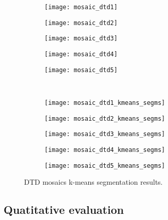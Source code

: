 \begin{figure}[!ht]
    \centering
    \begin{subfigure}[b]{0.19\textwidth}
        \texttt{[image: mosaic\_dtd1]}
    \end{subfigure} 
    \begin{subfigure}[b]{0.19\textwidth}
    	\texttt{[image: mosaic\_dtd2]}
    \end{subfigure}     
    \begin{subfigure}[b]{0.19\textwidth}
        \texttt{[image: mosaic\_dtd3]}
    \end{subfigure}
    \begin{subfigure}[b]{0.19\textwidth}
    	\texttt{[image: mosaic\_dtd4]}
    \end{subfigure}    
    \begin{subfigure}[b]{0.19\textwidth}
        \texttt{[image: mosaic\_dtd5]}
    \end{subfigure} \\ [2ex]
    
    \begin{subfigure}[b]{0.19\textwidth}
    	\texttt{[image: mosaic\_dtd1\_kmeans\_segms]}
        \caption{}
    \end{subfigure}     
    \begin{subfigure}[b]{0.19\textwidth}
        \texttt{[image: mosaic\_dtd2\_kmeans\_segms]}
        \caption{}
    \end{subfigure} 
    \begin{subfigure}[b]{0.19\textwidth}
    	\texttt{[image: mosaic\_dtd3\_kmeans\_segms]}
        \caption{}
    \end{subfigure}     
    \begin{subfigure}[b]{0.19\textwidth}
        \texttt{[image: mosaic\_dtd4\_kmeans\_segms]}
        \caption{}
    \end{subfigure}
    \begin{subfigure}[b]{0.19\textwidth}
    	\texttt{[image: mosaic\_dtd5\_kmeans\_segms]}
        \caption{}
    \end{subfigure} 
        	    
    \caption{DTD mosaics k-means segmentation results.}\label{fig:kmeans_segms_dtd_mosaics}    
\end{figure}


\subsection{Quatitative evaluation}

